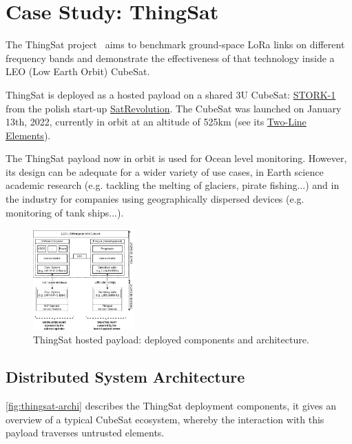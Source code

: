 \section{Case Study: ThingSat}
\label{sec:case-study}

The ThingSat project~\cite{git:thingsat-repo} aims to benchmark ground-space
LoRa links on different frequency bands and demonstrate the
effectiveness of that technology inside a LEO (Low Earth Orbit) CubeSat.

ThingSat is deployed as a hosted payload on a shared 3U CubeSat:
\href{https://space.skyrocket.de/doc_sdat/stork-1.htm}{STORK-1} from the polish
start-up \href{https://www.satrevolution.com/}{SatRevolution}. The CubeSat was
launched on January 13th, 2022, currently in orbit at an altitude of 525km (see its
\href{https://www.n2yo.com/database/?q=STORK-1\#results}{Two-Line Elements}).

The ThingSat payload now in orbit is used for Ocean level monitoring. However,
its design can be adequate for a wider variety of use cases, in Earth science
academic research (e.g. tackling the  melting of glaciers, pirate fishing...)
and in the industry for companies using geographically dispersed devices (e.g.
monitoring of tank ships...).

\begin{figure}[t]
\centering
    \includegraphics[width=0.35\textwidth]{Figures/globecom-thingsat-mods.jpg}
    \caption{ThingSat hosted payload: deployed components and architecture.}
    \label{fig:thingsat-archi}
\end{figure}

\subsection{Distributed System Architecture}
\label{sec:thingsat-hw}
\autoref{fig:thingsat-archi} describes the ThingSat deployment components, it gives an
overview of a typical CubeSat ecosystem, whereby the interaction with this payload
traverses untrusted elements.

